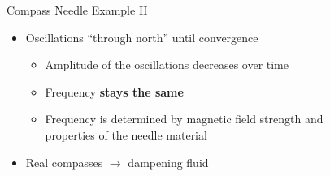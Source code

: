 \begin{frame}{Compass Needle Example II}

    \begin{itemize}
        \item Oscillations ``through north'' until convergence
              \begin{itemize}
                  \item Amplitude of the oscillations decreases over time
                  \item Frequency \textbf{stays the same}
                  \item Frequency is determined by magnetic field strength and \\ properties of the needle material
              \end{itemize}
        \item Real compasses $\rightarrow$ dampening fluid
    \end{itemize}

\end{frame}

